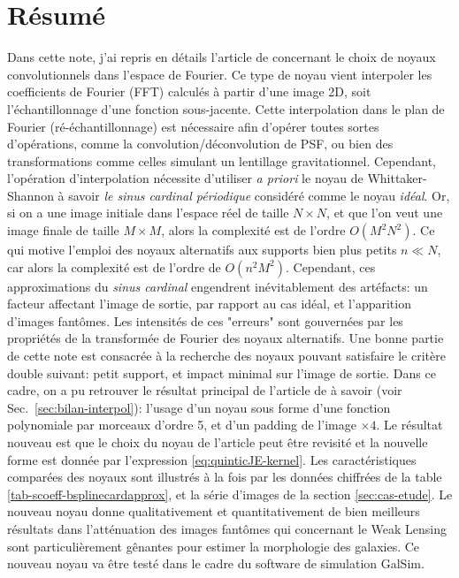 \documentclass[11pt,twoside]{article}
\begin{document}
\section{Résumé}
% 
Dans cette note, j'ai repris en détails l'article de \cite{2014PASP..126..287B} concernant le choix de noyaux convolutionnels dans l'espace de Fourier. Ce type de noyau vient interpoler les coefficients de Fourier (FFT) calculés à partir d'une image 2D, soit l'échantillonnage d'une fonction sous-jacente. Cette interpolation  dans le plan de Fourier (ré-échantillonnage) est nécessaire afin d'opérer toutes sortes d'opérations, comme la convolution/déconvolution de PSF, ou bien des transformations comme celles simulant un lentillage gravitationnel. Cependant, l'opération d'interpolation nécessite d'utiliser\textit{ a priori} le noyau de Whittaker-Shannon à savoir \textit{le sinus cardinal périodique} considéré comme le noyau \textit{idéal}. Or, si on a une image initiale dans l'espace réel de taille $N\times N$, et que l'on veut une image finale de taille $M\times M$, alors la complexité est de l'ordre $O(M^2N^2)$. Ce qui motive l'emploi des noyaux alternatifs aux supports bien plus petits $n\ll N$, car alors la complexité est de l'ordre de $O(n^2 M^2)$. Cependant, ces approximations du \textit{sinus cardinal} engendrent inévitablement des artéfacts: un facteur affectant l'image de sortie, par rapport au cas idéal, et l'apparition d'images fantômes. Les intensités de ces "erreurs" sont gouvernées par les propriétés de la transformée de Fourier des noyaux alternatifs. Une bonne partie de cette note est consacrée à la recherche des noyaux pouvant satisfaire le critère double suivant: petit support, et impact minimal sur l'image de sortie. Dans ce cadre, on a pu retrouver le résultat principal de l'article de  \cite{2014PASP..126..287B} à savoir (voir Sec.~\ref{sec:bilan-interpol}): l'usage d'un noyau sous forme d'une fonction polynomiale par morceaux d'ordre 5, et d'un padding de l'image $\times 4$. Le résultat nouveau est que le choix du noyau de l'article peut être revisité et la nouvelle forme est donnée par l'expression \ref{eq:quinticJE-kernel}. Les caractéristiques comparées des noyaux sont illustrés à la fois par les données chiffrées de la table \ref{tab-scoeff-bsplinecardapprox}, et la série d'images de la section  \ref{sec:cas-etude}. Le nouveau noyau donne qualitativement et quantitativement de bien meilleurs résultats dans l'atténuation des images fantômes qui concernant le Weak Lensing sont particulièrement gênantes pour estimer la morphologie des galaxies. Ce nouveau noyau va être testé dans le cadre du software de simulation \textsf{GalSim}.
\end{document}
